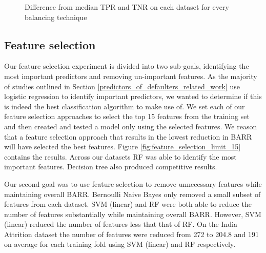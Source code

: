 \documentclass{sig-alternate-05-2015}
\begin{document}
	\begin{figure}
		\hspace*{1.2em}
		\centering
		\caption{Difference from median TPR and TNR on each dataset for every balancing technique}
		\label{fig:balancing_per_dataset}
	\end{figure}
	
	\subsection{Feature selection}
	Our feature selection experiment is divided into two sub-goals, identifying the most important predictors and removing un-important features. As the majority of studies outlined in Section \ref{predictors_of_defaulters_related_work} use logistic regression to identify important predictors, we wanted to determine if this is indeed the best classification algorithm to make use of. We set each of our feature selection approaches to select the top 15 features from the training set and then created and tested a model only using the selected features. We reason that a feature selection approach that results in the lowest reduction in BARR will have selected the best features. Figure \ref{fig:feature_selection_limit_15} contains the results. Across our datasets RF was able to identify the most important features. Decision tree also produced competitive results.
	
	Our second goal was to use feature selection to remove unnecessary features while maintaining overall BARR. Bernoulli Naive Bayes only removed a small subset of features from each dataset. SVM (linear) and RF were both able to reduce the number of features substantially while maintaining overall BARR. However, SVM (linear) reduced the number of features less that that of RF. On the India Attrition dataset the number of features were reduced from 272 to 204.8 and 191 on average for each training fold using SVM (linear) and RF respectively.
	
\end{document}

